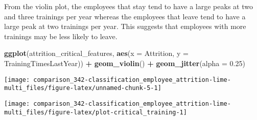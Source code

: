 \documentclass[]{book}
\newenvironment{Shaded}{\begin{snugshade}}{\end{snugshade}}
\newcommand{\DataTypeTok}[1]{\textcolor[rgb]{0.13,0.29,0.53}{#1}}
\newcommand{\DecValTok}[1]{\textcolor[rgb]{0.00,0.00,0.81}{#1}}
\newcommand{\FloatTok}[1]{\textcolor[rgb]{0.00,0.00,0.81}{#1}}
\newcommand{\KeywordTok}[1]{\textcolor[rgb]{0.13,0.29,0.53}{\textbf{#1}}}
\newcommand{\NormalTok}[1]{#1}
\newcommand{\OperatorTok}[1]{\textcolor[rgb]{0.81,0.36,0.00}{\textbf{#1}}}
\newcommand{\StringTok}[1]{\textcolor[rgb]{0.31,0.60,0.02}{#1}}
\begin{document}
From the violin plot, the employees that stay tend to have a large peaks at two and three trainings per year whereas the employees that leave tend to have a large peak at two trainings per year. This suggests that employees with more trainings may be less likely to leave.\\

\begin{Shaded}
\begin{Highlighting}[]
\KeywordTok{ggplot}\NormalTok{(attrition_critical_features, }\KeywordTok{aes}\NormalTok{(}\DataTypeTok{x =}\NormalTok{ Attrition, }
                                        \DataTypeTok{y =}\NormalTok{ TrainingTimesLastYear)) }\OperatorTok{+}
\StringTok{    }\KeywordTok{geom_violin}\NormalTok{()  }\OperatorTok{+}
\StringTok{    }\KeywordTok{geom_jitter}\NormalTok{(}\DataTypeTok{alpha =} \FloatTok{0.25}\NormalTok{)}
\end{Highlighting}
\end{Shaded}

\begin{center}\texttt{[image: comparison\_342-classification\_employee\_attrition-lime-multi\_files/figure-latex/unnamed-chunk-5-1]} \end{center}

\begin{Shaded}
\end{Shaded}

\begin{center}\texttt{[image: comparison\_342-classification\_employee\_attrition-lime-multi\_files/figure-latex/plot-critical\_training-1]} \end{center}
\end{document}
